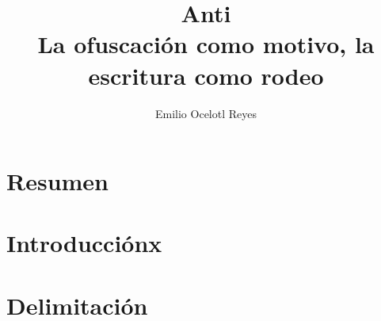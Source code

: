 \documentclass[12pt,letterpaper, twocolumn]{article}
\author{Emilio Ocelotl Reyes}
\title{Anti\\
  La ofuscación como motivo, la escritura como rodeo}
\begin{document}
\maketitle

\section*{Resumen}



\section*{Introducciónx}



\section*{Delimitación}











%
{} 

\end{document}

